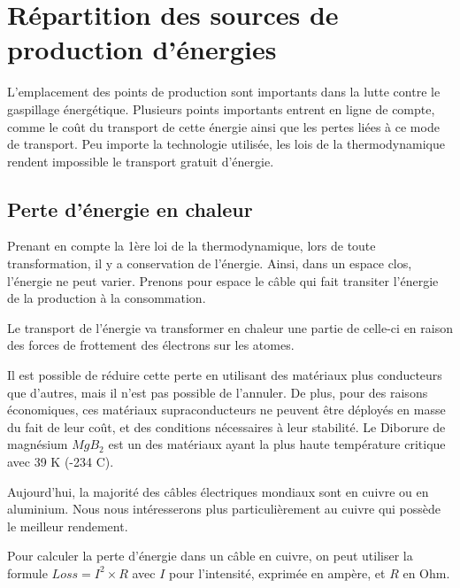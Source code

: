 \chapter{Répartition des sources de production d'énergies}

L'emplacement des points de production sont importants dans la lutte contre le gaspillage énergétique.
Plusieurs points importants entrent en ligne de compte, comme le coût du transport de cette énergie ainsi que les pertes liées à ce mode de transport.
Peu importe la technologie utilisée, les lois de la thermodynamique rendent impossible le transport gratuit d'énergie.

\section{Perte d'énergie en chaleur}

Prenant en compte la 1ère loi de la thermodynamique, lors de toute transformation, il y a
conservation de l'énergie.
Ainsi, dans un espace clos, l'énergie ne peut varier.
Prenons pour espace le câble qui fait transiter l'énergie de la production à la consommation.

Le transport de l'énergie va transformer en chaleur une partie de celle-ci en raison
des forces de frottement des électrons sur les atomes.

Il est possible de réduire cette perte en utilisant des matériaux plus conducteurs que
d'autres, mais il n'est pas possible de l'annuler.
De plus, pour des raisons économiques, ces matériaux supraconducteurs ne peuvent être
déployés en masse du fait de leur coût, et des conditions nécessaires à leur stabilité.
Le Diborure de magnésium $MgB_2$ est un des matériaux ayant la plus haute température
critique avec 39 K (-234 C).

Aujourd'hui, la majorité des câbles électriques mondiaux sont en cuivre ou en aluminium.
Nous nous intéresserons plus particulièrement au cuivre qui possède le meilleur rendement.

Pour calculer la perte d'énergie dans un câble en cuivre, on peut utiliser
la formule $Loss = I^2\times R$ avec $I$ pour l'intensité, exprimée en ampère, et $R$ en Ohm.

